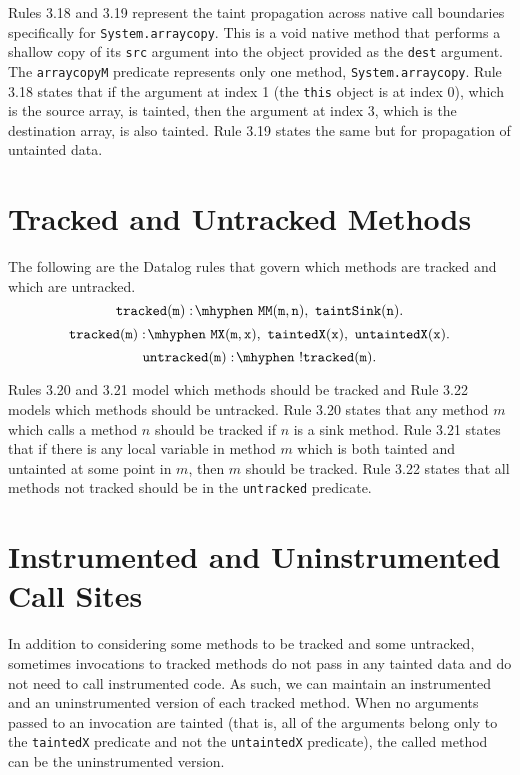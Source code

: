 Rules 3.18 and 3.19 represent the taint propagation across native call boundaries specifically for \texttt{System.arraycopy}. This is a void native method that performs a shallow copy of its \texttt{src} argument into the object provided as the \texttt{dest} argument. The \texttt{arraycopyM} predicate represents only one method, \texttt{System.arraycopy}. Rule 3.18 states that if the argument at index 1 (the \texttt{this} object is at index 0), which is the source array, is tainted, then the argument at index 3, which is the destination array, is also tainted. Rule 3.19 states the same but for propagation of untainted data.
\section{Tracked and Untracked Methods}
The following are the Datalog rules that govern which methods are tracked and which are untracked.
\begin{equation}
  \mathtt{tracked(m) \is MM(m,n) \also taintSink(n).}
\end{equation}
\begin{equation}
  \mathtt{tracked(m) \is MX(m,x) \also taintedX(x) \also untaintedX(x).}
\end{equation}
\begin{equation}
  \mathtt{untracked(m) \is !tracked(m).}
\end{equation}


Rules 3.20 and 3.21 model which methods should be tracked and Rule 3.22 models which methods should be untracked. Rule 3.20 states that any method $m$ which calls a method $n$ should be tracked if $n$ is a sink method. Rule 3.21 states that if there is any local variable in method $m$ which is both tainted and untainted at some point in $m$, then $m$ should be tracked. Rule 3.22 states that all methods not tracked should be in the \texttt{untracked} predicate.
\section{Instrumented and Uninstrumented Call Sites}
In addition to considering some methods to be tracked and some untracked, sometimes invocations to tracked methods do not pass in any tainted data and do not need to call instrumented code. As such, we can maintain an instrumented and an uninstrumented version of each tracked method. When no arguments passed to an invocation are tainted (that is, all of the arguments belong only to the \texttt{taintedX} predicate and not the \texttt{untaintedX} predicate), the called method can be the uninstrumented version. 

